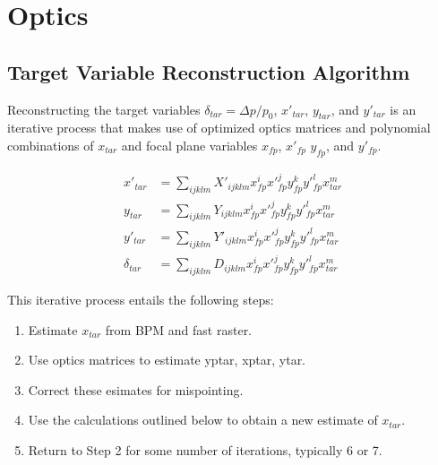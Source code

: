 \section{Optics}

\subsection{Target Variable Reconstruction Algorithm}
Reconstructing the target variables
$\delta_{tar}=\Delta p/p_0$, $x'_{tar}$, $y_{tar}$, and $y'_{tar}$
is an iterative process that makes use of optimized optics matrices
and polynomial combinations of $x_{tar}$ and focal plane variables
$x_{fp}$, $x'_{fp}$ $y_{fp}$, and $y'_{fp}$.

\begin{align} \label{eqn:optics_reconstruction}
    x'_{tar}     &= \sum_{ijklm} X'_{ijklm} x^i_{fp} x'^j_{fp} y^k_{fp} y'^l_{fp} x^m_{tar} \\
    y_{tar}      &= \sum_{ijklm} Y_{ijklm}  x^i_{fp} x'^j_{fp} y^k_{fp} y'^l_{fp} x^m_{tar} \\
    y'_{tar}     &= \sum_{ijklm} Y'_{ijklm} x^i_{fp} x'^j_{fp} y^k_{fp} y'^l_{fp} x^m_{tar} \\
    \delta_{tar} &= \sum_{ijklm} D_{ijklm}  x^i_{fp} x'^j_{fp} y^k_{fp} y'^l_{fp} x^m_{tar}
\end{align}

This iterative process entails the following steps:
\begin{enumerate}
    \item Estimate $x_{tar}$ from BPM and fast raster.
    \item Use optics matrices to estimate yptar, xptar, ytar.
    \item Correct these esimates for mispointing.
    \item Use the calculations outlined below to obtain a new estimate of $x_{tar}$.
    \item Return to Step 2 for some number of iterations, typically 6 or 7.
\end{enumerate}

